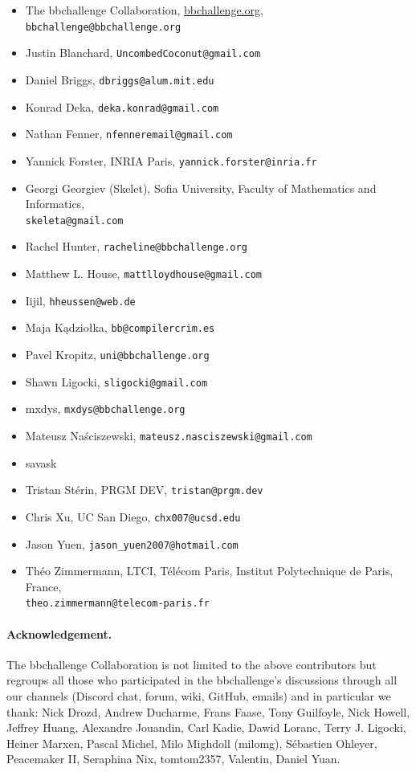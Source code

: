 \documentclass[a4paper,british]{article}
\theoremstyle{definition} %
\numberwithin{equation}{section}
\theoremstyle{definition} %
\begin{document}
\begin{itemize}
    \item The bbchallenge Collaboration, \url{bbchallenge.org}, \texttt{bbchallenge@bbchallenge.org}
    \item Justin Blanchard, \texttt{UncombedCoconut@gmail.com}
    \item Daniel Briggs, \texttt{dbriggs@alum.mit.edu}
    \item Konrad Deka, \texttt{deka.konrad@gmail.com}
    \item Nathan Fenner, \texttt{nfenneremail@gmail.com}
    \item Yannick Forster, INRIA Paris, \texttt{yannick.forster@inria.fr}
    \item Georgi Georgiev (Skelet), Sofia University, Faculty of Mathematics and Informatics,\\\texttt{skeleta@gmail.com}
    \item Rachel Hunter, \texttt{racheline@bbchallenge.org}
    \item Matthew L. House, \texttt{mattlloydhouse@gmail.com}
    \item Iijil, \texttt{hheussen@web.de}
    \item Maja Kądziołka, \texttt{bb@compilercrim.es}
    \item Pavel Kropitz, \texttt{uni@bbchallenge.org}
    \item Shawn Ligocki, \texttt{sligocki@gmail.com}
    \item mxdys, \texttt{mxdys@bbchallenge.org}
    \item Mateusz Na\'{s}ciszewski, \texttt{mateusz.nasciszewski@gmail.com}
    \item savask
    \item Tristan Stérin, PRGM DEV, \texttt{tristan@prgm.dev}
    \item Chris Xu, UC San Diego, \texttt{chx007@ucsd.edu}
    \item Jason Yuen, \texttt{jason\_yuen2007@hotmail.com}
    \item Théo Zimmermann, LTCI, Télécom Paris, Institut Polytechnique de Paris, France, \\ \texttt{theo.zimmermann@telecom-paris.fr}
\end{itemize}

\paragraph{Acknowledgement.} The bbchallenge Collaboration is not limited to the above contributors but regroups all those who participated in the bbchallenge's discussions through all our channels (Discord chat, forum, wiki, GitHub, emails) and in particular we thank:  Nick Drozd, Andrew Ducharme, Frans Faase, Tony Guilfoyle, Nick Howell, Jeffrey Huang, Alexandre Jouandin, Carl Kadie, Dawid Loranc, Terry J. Ligocki, Heiner Marxen, Pascal Michel, Milo Mighdoll (milomg), Sébastien Ohleyer, Peacemaker II, Seraphina Nix, tomtom2357, Valentin, Daniel Yuan.
\end{document}
